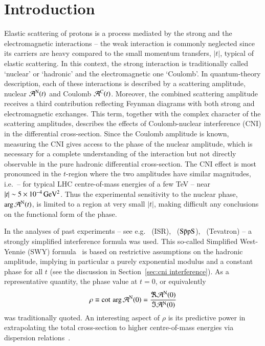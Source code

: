 \section{Introduction}
\label{sec:introduction}

Elastic scattering of protons is a process mediated by the strong and the electromagnetic interactions -- the weak interaction is commonly neglected since its carriers are heavy compared to the small momentum transfers, $|t|$, typical of elastic scattering. In this context, the strong interaction is traditionally called `nuclear' or `hadronic' and the electromagnetic one `Coulomb'. In quantum-theory description, each of these interactions is described by a scattering amplitude, nuclear ${\cal A}^{\rm N}(t)$ and Coulomb ${\cal A}^{\rm C}(t)$. Moreover, the combined scattering amplitude receives a third contribution reflecting Feynman diagrams with both strong and electromagnetic exchanges. This term, together with the complex character of the scattering amplitudes, describes the effects of Coulomb-nuclear interference (CNI) in the differential cross-section. Since the Coulomb amplitude is known, measuring the CNI gives access to the phase of the nuclear amplitude, which is necessary for a complete understanding of the interaction but not directly observable in the pure hadronic differential cross-section. The CNI effect is most pronounced in the $t$-region where the two amplitudes have similar magnitudes, i.e.~-- for typical LHC centre-of-mass energies of a few TeV -- near $|t| \sim 5 \times 10^{-4}\,\rm GeV^{2}$. Thus the experimental sensitivity to the nuclear phase, $\arg {\cal A}^{\rm N}(t)$, is limited to a region at very small $|t|$, making difficult any conclusions on the 
functional form of the phase.

In the analyses of past experiments -- see e.g.~\cite{plb43,plb66,npb141,prl47,plb115,plb120,plb128,npb262} 
(ISR),~\cite{plb198,plb316} ($\rm S\bar{p}pS$),~\cite{prl68} (Tevatron) --
a strongly simplified interference formula was used. This so-called
Simplified West-Yennie (SWY) formula~\cite{wy68} is based on restrictive assumptions on the 
hadronic amplitude, implying in particular a purely exponential modulus and a 
constant phase for all $t$ (see the discussion in 
Section~\ref{sec:cni interference}).
As a representative quantity, the phase value at $t=0$, or equivalently
\begin{equation}
\label{eq:rho def}
\rho \equiv \cot \, \arg {\cal A}^{\rm N} (0) = \frac{\Re {\cal A}^{\rm N} (0)}{\Im {\cal A}^{\rm N} (0)}
\end{equation}
was traditionally quoted. 
An interesting aspect of $\rho$ is its predictive power in extrapolating the total cross-section to higher centre-of-mass energies via dispersion 
relations~\cite{dremin-dispersion}. 

